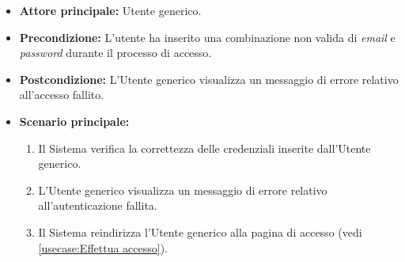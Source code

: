 \label{usecase:Visualizzazione errore d'accesso}

\begin{itemize}
	\item \textbf{Attore principale:} Utente generico.
	\item \textbf{Precondizione:}
    L'utente ha inserito una combinazione non valida di \textit{email} e \textit{password} durante il processo di accesso.
	\item \textbf{Postcondizione:} L'Utente generico visualizza un messaggio di errore relativo all'accesso fallito.

	\item \textbf{Scenario principale:}
	\begin{enumerate}
        \item Il Sistema verifica la correttezza delle credenziali inserite dall'Utente generico.
        \item L'Utente generico visualizza un messaggio di errore relativo all'autenticazione fallita.
        \item Il Sistema reindirizza l'Utente generico alla pagina di accesso (vedi \autoref{usecase:Effettua accesso}).
    \end{enumerate}
	
\end{itemize}
